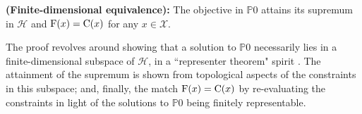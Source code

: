 \begin{theorem}
	 \label{thm.main}
	 {\normalfont \textbf{(Finite-dimensional equivalence):}}
	The objective in $\mathds{P}0$ attains its supremum in $\mathcal{H}$ and ${\normalfont \text{F}}(x) = {\normalfont \text{C}}(x)$ for any $x \in \mathcal{X}$.
\end{theorem}

The proof revolves around showing that a solution to $\mathds{P}0$ necessarily lies in a finite-dimensional subspace of $\mathcal{H}$, in a ``representer theorem" spirit \citep{scholkopf2001generalized}. The attainment of the supremum is shown from topological aspects of the constraints in this subspace; and, finally, the match ${\normalfont \text{F}}(x) = {\normalfont \text{C}}(x)$ by re-evaluating the constraints in light of the solutions to $\mathds{P}0$ being finitely representable. 

